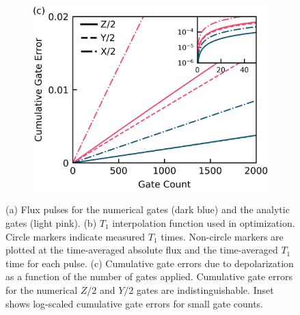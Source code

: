 \begin{figure}[ht]
\begin{subfigure}{.23\textwidth}
    \caption{\label{fig:longitudeb}}
  \end{subfigure}\hfill
  \begin{subfigure}{.4\textwidth}
    \includegraphics[width=\linewidth]{assets/f1c.png}
    \caption{\label{fig:longitudec}}
  \end{subfigure}
  \caption{
    (a) Flux pulses for the numerical gates (dark blue)
    and the analytic gates (light pink).
    (b) $T_{1}$ interpolation function used in optimization. Circle markers
    indicate measured $T_{1}$ times. Non-circle markers
    are plotted at the time-averaged 
    absolute flux and the time-averaged $T_{1}$ time for each pulse.
    (c) Cumulative gate errors due to depolarization as a function of the
    number of gates applied.
    Cumulative gate errors for the numerical $Z/2$ and $Y/2$ gates
    are indistinguishable. Inset shows log-scaled cumulative gate errors
    for small gate counts.
  }
  \label{fig:longitude}
\end{figure}


